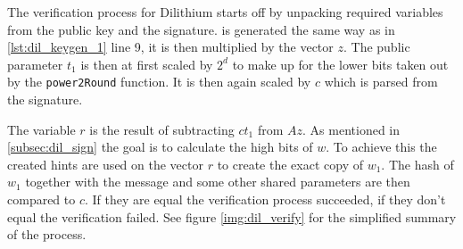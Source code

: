 The verification process for Dilithium starts off by unpacking required variables from the public key and the signature.  is generated the same way as in \ref{lst:dil_keygen_1} line 9, it is then multiplied by the vector $z$. The public parameter $t_1$ is then at first scaled by $2^d$ to make up for the lower bits taken out by the \texttt{power2Round} function. It is then again scaled by $c$ which is parsed from the signature.

The variable $r$ is the result of subtracting $ct_1$ from $Az$. As mentioned in \ref{subsec:dil_sign} the goal is to calculate the high bits of $w$. To achieve this the created hints are used on the vector $r$ to create the exact copy of $w_1$. The hash of $w_1$ together with the message and some other shared parameters are then compared to $c$. If they are equal the verification process succeeded, if they don't equal the verification failed. See figure \ref{img:dil_verify} for the simplified summary of the process.

